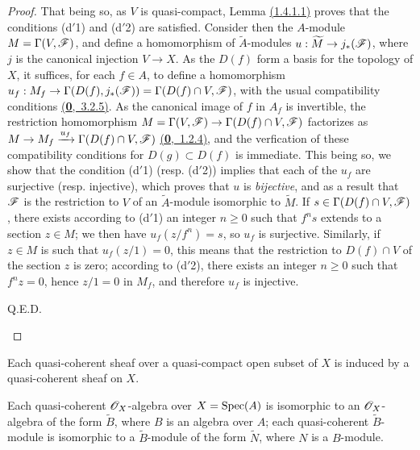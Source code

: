 \begin{proof}
That being so, as $V$ is quasi-compact, Lemma \hyperref[lem-1.1.4.1.1]{(1.4.1.1)} proves that
the conditions (d$'$1) and (d$'$2) are satisfied. Consider then the $A$-module
$M=\Gamma(V,\mathscr{F})$, and define a homomorphism of $\widetilde{A}$-modules
$u:\widetilde{M}\to j_*(\mathscr{F})$, where $j$ is the canonical injection $V\to X$. As the
$D(f)$ form a basis for the topology of $X$, it suffices, for each $f\in A$, to define a
homomorphism $u_f:M_f\to\Gamma(D(f),j_*(\mathscr{F}))=\Gamma(D(f)\cap V,\mathscr{F})$, with the usual
compatibility conditions \hyperref[env-0.3.2.5]{(\textbf{0},~3.2.5)}. As the canonical image of $f$ in $A_f$ is
invertible, the restriction homomorphism $M=\Gamma(V,\mathscr{F})\to\Gamma(D(f)\cap V,\mathscr{F})$
factorizes as $M\to M_f\xrightarrow{u_f}\Gamma(D(f)\cap V,\mathscr{F})$ \hyperref[env-0.1.2.4]{(\textbf{0},~1.2.4)}, and the
verfication of these compatibility conditions for $D(g)\subset D(f)$ is immediate. This being
so, we show that the condition (d$'$1) (resp. (d$'$2)) implies that each of the $u_f$ are
surjective (resp. injective), which proves that $u$ is {\em bijective}, and as a result that
$\mathscr{F}$ is the restriction to $V$ of an $\widetilde{A}$-module isomorphic to
$\widetilde{M}$. If $s\in\Gamma(D(f)\cap V,\mathscr{F})$, there exists according to (d$'$1) an
integer $n\geqslant 0$ such that $f^n s$ extends to a section $z\in M$; we then have
$u_f(z/f^n)=s$, so $u_f$ is surjective. Similarly, if $z\in M$ is such that $u_f(z/1)=0$,
this means that the restriction to $D(f)\cap V$ of the section $z$ is zero; according to
(d$'$2), there exists an integer $n\geqslant 0$ such that $f^n z=0$, hence $z/1=0$ in $M_f$,
and therefore $u_f$ is injective.
\begin{flushright}
Q.E.D.
\end{flushright}
\end{proof}

\begin{cor}[1.4.2]
\label{cor-1.1.4.2}
Each quasi-coherent sheaf over a quasi-compact open subset of $X$ is induced by a
quasi-coherent sheaf on $X$.
\end{cor}

\begin{cor}[1.4.3]
\label{cor-1.1.4.3}
Each quasi-coherent $\mathscr{O}_X$-algebra over $X={\mathop{\mathrm{Spec}}\nolimits}(A)$ is isomorphic to an $\mathscr{O}_X$-algebra of
the form $\widetilde{B}$, where $B$ is an algebra over $A$; each quasi-coherent
$\widetilde{B}$-module is isomorphic to a $\widetilde{B}$-module of the form $\widetilde{N}$,
where $N$ is a $B$-module.
\end{cor}

